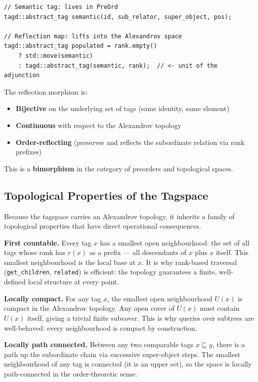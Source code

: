 \documentclass{article}
\begin{document}
\begin{lstlisting}[style=cpp, caption={The reflection morphism: lifting a tag from PreOrd into the Alexandrov space}]
// Semantic tag: lives in PreOrd
tagd::abstract_tag semantic(id, sub_relator, super_object, pos);

// Reflection map: lifts into the Alexandrov space
tagd::abstract_tag populated = rank.empty()
    ? std::move(semantic)
    : tagd::abstract_tag(semantic, rank);  // <- unit of the adjunction
\end{lstlisting}

The reflection morphism is:
\begin{itemize}
  \item \textbf{Bijective} on the underlying set of tags (same identity, same
        element)
  \item \textbf{Continuous} with respect to the Alexandrov topology
  \item \textbf{Order-reflecting} (preserves and reflects the subordinate
        relation via rank prefixes)
\end{itemize}

This is a \textbf{bimorphism} in the category of preorders and topological
spaces.

\subsection{Topological Properties of the Tagspace}

Because the tagspace carries an Alexandrov topology, it inherits a family of
topological properties that have direct operational consequences.

\textbf{First countable.} Every tag $x$ has a smallest open neighbourhood: the
set of all tags whose rank has $r(x)$ as a prefix --- all descendants of $x$
plus $x$ itself. This smallest neighbourhood is the local base at $x$. It is
why rank-based traversal (\texttt{get\_children}, \texttt{related}) is
efficient: the topology guarantees a finite, well-defined local structure at
every point.

\textbf{Locally compact.} For any tag $x$, the smallest open neighbourhood
$U(x)$ is compact in the Alexandrov topology. Any open cover of $U(x)$ must
contain $U(x)$ itself, giving a trivial finite subcover. This is why queries
over subtrees are well-behaved: every neighbourhood is compact by construction.

\textbf{Locally path connected.} Between any two comparable tags
$x \sqsubseteq y$, there is a path up the subordinate chain via successive
super-object steps. The smallest neighbourhood of any tag is connected (it is
an upper set), so the space is locally path-connected in the order-theoretic
sense.
\end{document}
